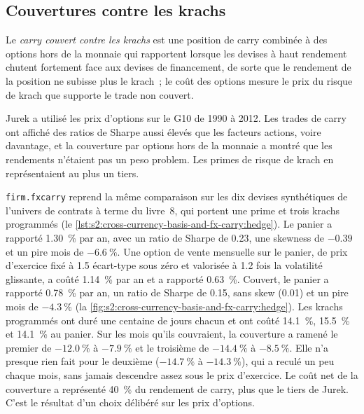 \subsection*{Couvertures contre les krachs}

\begin{definition}\label{def:s2:cross-currency-basis-and-fx-carry:hedged}
Le \emph{carry couvert contre les krachs} est une position de carry combinée à des options hors de la monnaie qui rapportent lorsque les devises à haut rendement
chutent fortement face aux devises de financement, de sorte que le rendement de la position ne subisse plus le krach~; le coût des options mesure le
prix du risque de krach que supporte le trade non couvert.
\end{definition}

Jurek a utilisé les prix d'options sur le G10 de 1990 à 2012. Les trades de carry ont affiché des ratios de Sharpe aussi élevés que les facteurs actions, voire davantage, et la couverture par
options hors de la monnaie a montré que les rendements n'étaient pas un peso problem. Les primes de risque de krach en représentaient au plus un tiers.

\texttt{firm.fxcarry} reprend la même comparaison sur les dix devises synthétiques de l'univers de contrats à terme du livre~8, qui portent une prime et trois
krachs programmés (le \cref{lst:s2:cross-currency-basis-and-fx-carry:hedge}). Le panier a rapporté 1.30~\% par an, avec un ratio de Sharpe de 0.23, une skewness de $-0.39$ et
un pire mois de $-6.6~\%$. Une option de vente mensuelle sur le panier, de prix d'exercice fixé à 1.5 écart-type sous zéro et valorisée à 1.2 fois la volatilité glissante, a coûté
1.14~\% par an et a rapporté 0.63~\%. Couvert, le panier a rapporté 0.78~\% par an, un ratio de Sharpe de 0.15, sans skew (0.01) et un pire mois de $-4.3~\%$
(la \cref{fig:s2:cross-currency-basis-and-fx-carry:hedge}). Les krachs programmés ont duré une centaine de jours chacun et ont coûté 14.1~\%, 15.5~\% et 14.1~\% au
panier. Sur les mois qu'ils couvraient, la couverture a ramené le premier de $-12.0~\%$ à $-7.9~\%$ et le troisième de $-14.4~\%$ à $-8.5~\%$. Elle n'a presque rien
fait pour le deuxième ($-14.7~\%$ à $-14.3~\%$), qui a reculé un peu chaque mois, sans jamais descendre assez sous le prix d'exercice. Le coût net de la couverture a représenté 40~\% du
rendement de carry, plus que le tiers de Jurek. C'est le résultat d'un choix délibéré sur les prix d'options.

